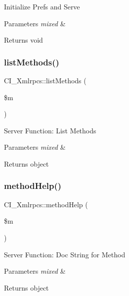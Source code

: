 Initialize Prefs and Serve


\begin{DoxyParams}{Parameters}
{\em mixed} & \\
\hline
\end{DoxyParams}
\begin{DoxyReturn}{Returns}
void 
\end{DoxyReturn}
\mbox{\label{class_c_i___xmlrpcs_a834bad153f5338a1dd22ea98de45ea4d}} 
\subsubsection{\texorpdfstring{list\+Methods()}{listMethods()}}
{\footnotesize\ttfamily C\+I\+\_\+\+Xmlrpcs\+::list\+Methods (\begin{DoxyParamCaption}\item[{}]{\$m }\end{DoxyParamCaption})}

Server Function\+: List Methods


\begin{DoxyParams}{Parameters}
{\em mixed} & \\
\hline
\end{DoxyParams}
\begin{DoxyReturn}{Returns}
object 
\end{DoxyReturn}
\mbox{\label{class_c_i___xmlrpcs_a2c52d6ca367f0e7a208863ba1db188e5}} 
\subsubsection{\texorpdfstring{method\+Help()}{methodHelp()}}
{\footnotesize\ttfamily C\+I\+\_\+\+Xmlrpcs\+::method\+Help (\begin{DoxyParamCaption}\item[{}]{\$m }\end{DoxyParamCaption})}

Server Function\+: Doc String for Method


\begin{DoxyParams}{Parameters}
{\em mixed} & \\
\hline
\end{DoxyParams}
\begin{DoxyReturn}{Returns}
object 
\end{DoxyReturn}
\mbox{\label{class_c_i___xmlrpcs_a13f551d9331bcb01d1514e78793ba34e}} 
